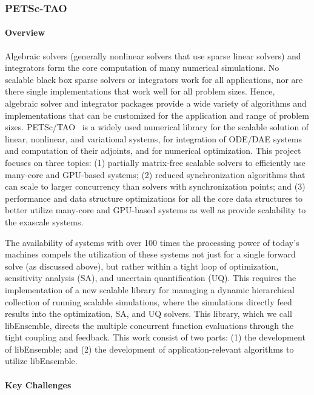\subsubsection{ PETSc-TAO} \label{subsubsect:petsc}
\paragraph{Overview} 

Algebraic solvers (generally nonlinear solvers that use sparse linear solvers) and integrators form the 
core computation of many numerical simulations. No scalable black box sparse solvers or integrators 
work for all applications, nor are there single implementations that work well for all problem sizes. 
Hence, algebraic solver and integrator packages provide a wide variety of algorithms and implementations 
that can be customized for the application and range of problem sizes. PETSc/TAO~\cite{petsc:homepage,petsc-man} 
is a widely used numerical library for the scalable solution of linear, nonlinear, and variational systems,
for integration of ODE/DAE systems and computation of their adjoints, and for numerical optimization. 
This project focuses on three topics: (1) partially matrix-free scalable solvers to efficiently use 
many-core and GPU-based systems; (2) reduced synchronization algorithms that can scale to larger 
concurrency than solvers with synchronization points; and (3) performance and data structure 
optimizations for all the core data structures to better utilize many-core and GPU-based 
systems as well as provide scalability to the exascale systems.

The availability of systems with over 100 times the processing power of today's machines compels the utilization 
of these systems not just for a single forward solve (as discussed above), but rather within a tight loop 
of optimization, sensitivity analysis (SA), and uncertain quantification (UQ). This requires the implementation 
of a new scalable library for managing a dynamic hierarchical collection of running scalable simulations, where 
the simulations directly feed results into the optimization, SA, and UQ solvers.  This library, which we call 
libEnsemble, directs the multiple concurrent function evaluations through the tight coupling and 
feedback. This work consist of two parts: (1) the development of libEnsemble; and (2) the development 
of application-relevant algorithms to utilize libEnsemble.

\paragraph{Key Challenges}

